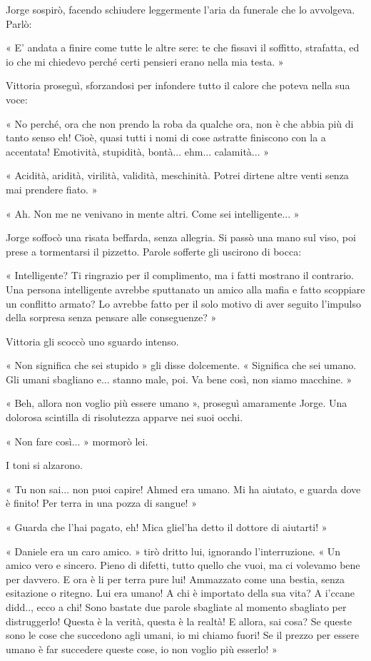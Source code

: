 Jorge sospirò, facendo schiudere leggermente l'aria da funerale che lo avvolgeva. Parlò:

« E' andata a finire come tutte le altre sere: te che fissavi il soffitto, strafatta, ed io che mi chiedevo perché certi pensieri erano nella mia testa. »

Vittoria proseguì, sforzandosi per infondere tutto il calore che poteva nella sua voce:

« No perché, ora che non prendo la roba da qualche ora, non è che abbia più di tanto senso eh! Cioè, quasi tutti i nomi di cose astratte finiscono con la a accentata! Emotività, stupidità, bontà... ehm... calamità... »

« Acidità, aridità, virilità, validità, meschinità. Potrei dirtene altre venti senza mai prendere fiato. »

« Ah. Non me ne venivano in mente altri. Come sei intelligente... »

Jorge soffocò una risata beffarda, senza allegria. Si passò una mano sul viso, poi prese a tormentarsi il pizzetto. Parole sofferte gli uscirono di bocca:

« Intelligente? Ti ringrazio per il complimento, ma i fatti mostrano il contrario. Una persona intelligente avrebbe sputtanato un amico alla mafia e fatto scoppiare un conflitto armato? Lo avrebbe fatto per il solo motivo di aver seguito l'impulso della sorpresa senza pensare alle conseguenze? »

Vittoria gli scoccò uno sguardo intenso.

« Non significa che sei stupido » gli disse dolcemente. « Significa che sei umano. Gli umani sbagliano e... stanno male, poi. Va bene così, non siamo macchine. »

« Beh, allora non voglio più essere umano », proseguì amaramente Jorge. Una dolorosa scintilla di risolutezza apparve nei suoi occhi.

« Non fare così... » mormorò lei.

I toni si alzarono.

« Tu non sai... non puoi capire! Ahmed era umano. Mi ha aiutato, e guarda dove è finito! Per terra in una pozza di sangue! »

« Guarda che l'hai pagato, eh! Mica gliel'ha detto il dottore di aiutarti! »

« Daniele era un caro amico. » tirò dritto lui, ignorando l'interruzione. « Un amico vero e sincero. Pieno di difetti, tutto quello che vuoi, ma ci volevamo bene per davvero. E ora è li per terra pure lui! Ammazzato come una bestia, senza esitazione o ritegno. Lui era umano! A chi è importato della sua vita? A i'ccane didd.., ecco a chi! Sono bastate due parole sbagliate al momento sbagliato per distruggerlo! Questa è la verità, questa è la realtà! E allora, sai cosa? Se queste sono le cose che succedono agli umani, io mi chiamo fuori! Se il prezzo per essere umano è far succedere queste cose, io non voglio più esserlo! »

